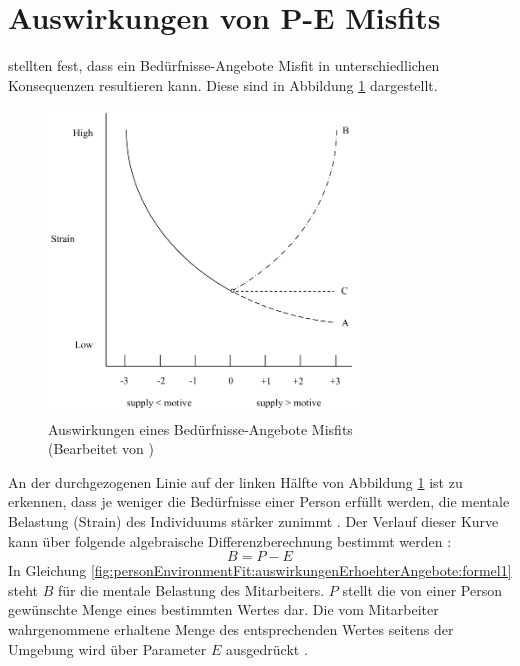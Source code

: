 \section{Auswirkungen von P-E Misfits}
\label{ch:personEnvironmentFit:auswirkungenErhoehterAngebote}
\textcite{mechanismsOfJobStressAndStrain:1982} stellten fest, dass ein Bedürfnisse-Angebote Misfit in unterschiedlichen Konsequenzen resultieren kann. Diese sind in Abbildung \ref{fig:personEnvironmentFit:auswirkungenErhoehterAngebote:abb1} dargestellt.

\begin{figure}[h]
	\centering
	\includegraphics[width=0.75\textwidth]{gfx/ueberschuss_supply_motive.png}
	\caption{Auswirkungen eines Bedürfnisse-Angebote Misfits \cite[S. 23]{edwards:2008}\\(Bearbeitet von \myName)}
	\label{fig:personEnvironmentFit:auswirkungenErhoehterAngebote:abb1}
\end{figure}

An der durchgezogenen Linie auf der linken Hälfte von Abbildung \ref{fig:personEnvironmentFit:auswirkungenErhoehterAngebote:abb1} ist zu erkennen, dass je weniger die Bedürfnisse einer Person erfüllt werden, die mentale Belastung (Strain) des Individuums stärker zunimmt \cite[S. 30]{mechanismsOfJobStressAndStrain:1982}. Der Verlauf dieser Kurve kann über folgende algebraische Differenzberechnung bestimmt werden \cite[S. 2]{edwards:1993}:
\begin{equation}
	B = P - E
	\label{fig:personEnvironmentFit:auswirkungenErhoehterAngebote:formel1}
\end{equation}
In Gleichung \ref{fig:personEnvironmentFit:auswirkungenErhoehterAngebote:formel1} steht $B$ für die mentale Belastung des Mitarbeiters. $P$ stellt die von einer Person gewünschte Menge eines bestimmten Wertes dar. Die vom Mitarbeiter wahrgenommene erhaltene Menge des entsprechenden Wertes seitens der Umgebung wird über Parameter $E$ ausgedrückt \cite[S. 2]{edwards:1993}.

